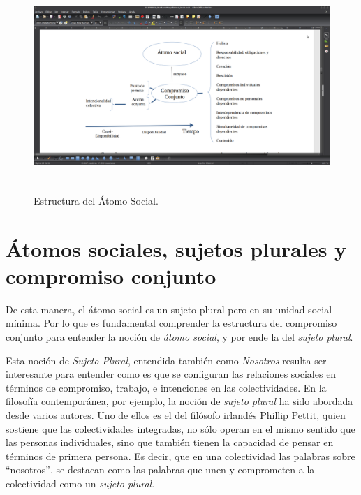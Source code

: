 \documentclass[oneside]{book}
\begin{document}
\begin{figure}[h]
	\centering
	\includegraphics[width=12.5cm, height=8cm]{img/esquema_3}
	\caption{Estructura del Átomo Social.}
\end{figure}
\section{Átomos sociales, sujetos plurales y compromiso conjunto}


De esta manera, el átomo social es un sujeto plural pero en su unidad social mínima. Por lo que es fundamental comprender la estructura del compromiso conjunto para entender la noción de \textit{átomo social}, y por ende la del \textit{sujeto plural}.

Esta noción de \textit{Sujeto Plural}, entendida también como \textit{Nosotros} resulta ser interesante para entender como es que se configuran las relaciones sociales en términos de compromiso, trabajo, e intenciones en las colectividades. En la filosofía contemporánea, por ejemplo, la noción de \textit{sujeto plural} ha sido abordada desde varios autores. Uno de ellos es el del filósofo irlandés Phillip Pettit\cite{pettit}, quien sostiene que las colectividades integradas, no sólo operan en el mismo sentido que las personas individuales, sino que también tienen la capacidad de pensar en términos de primera persona. Es decir, que en una colectividad las palabras sobre “nosotros”, se destacan como las palabras que unen y comprometen a la colectividad como un \textit{sujeto plural}.
\end{document}
